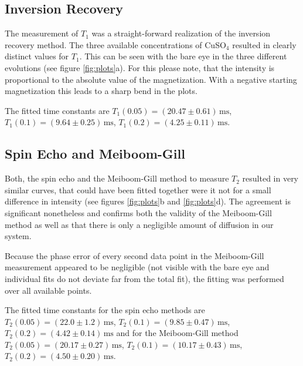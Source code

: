 \documentclass[a4paper]{scrartcl}
\numberwithin{equation}{section}
\numberwithin{figure}{section}
\numberwithin{table}{section}
\begin{document}
\subsection{Inversion Recovery}
The measurement of $T_1$ was a straight-forward realization of the inversion recovery method. The three available concentrations of CuSO$_4$ resulted in clearly distinct values for $T_1$. This can be seen with the bare eye in the three different evolutions (see figure \ref{fig:plots}a). For this please note, that the intensity is proportional to the absolute value of the magnetization. With a negative starting magnetization this leads to a sharp bend in the plots.

The fitted time constants are $T_1(0.05)=(20.47\pm 0.61)\,\text{ms}$, $T_1(0.1)=(9.64\pm 0.25)\,\text{ms}$, $T_1(0.2)=(4.25\pm 0.11)\,\text{ms}$.

\subsection{Spin Echo and Meiboom-Gill}
Both, the spin echo and the Meiboom-Gill method to measure $T_2$ resulted in very similar curves, that could have been fitted together were it not for a small difference in intensity (see figures \ref{fig:plots}b and \ref{fig:plots}d). The agreement is significant nonetheless and confirms both the validity of the Meiboom-Gill method as well as that there is only a negligible amount of diffusion in our system.

Because the phase error of every second data point in the Meiboom-Gill measurement appeared to be negligible (not visible with the bare eye and individual fits do not deviate far from the total fit), the fitting was performed over all available points.

The fitted time constants for the spin echo methods are $T_2(0.05)=(22.0\pm 1.2)\,\text{ms}$, $T_2(0.1)=(9.85\pm 0.47)\,\text{ms}$, $T_2(0.2)=(4.42\pm 0.14)\,\text{ms}$ and for the Meiboom-Gill method $T_2(0.05)=(20.17\pm 0.27)\,\text{ms}$, $T_2(0.1)=(10.17\pm 0.43)\,\text{ms}$, $T_2(0.2)=(4.50\pm 0.20)\,\text{ms}$.
\end{document}
